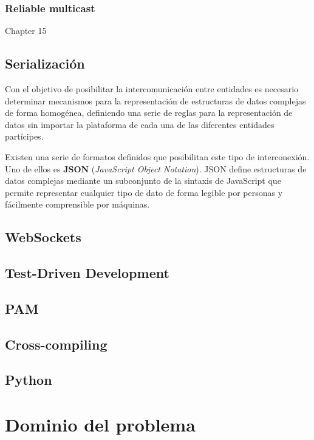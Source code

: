 \subsection{Reliable multicast}

Chapter 15

\section{Serialización}

Con el objetivo de posibilitar la intercomunicación entre entidades es necesario determinar mecanismos para la representación de estructuras de datos complejas de forma homogénea, definiendo una serie de reglas para la representación de datos sin importar la plataforma de cada una de las diferentes entidades partícipes.

Existen una serie de formatos definidos que posibilitan este tipo de interconexión. Uno de ellos es \textbf{JSON} (\textit{JavaScript Object Notation}). JSON define estructuras de datos complejas mediante un subconjunto de la sintaxis de JavaScript que permite representar cualquier tipo de dato de forma legible por personas y fácilmente comprensible por máquinas.

\section{WebSockets}

\section{Test-Driven Development}


\section{PAM}

\section{Cross-compiling}

\section{Python}

\chapter{Dominio del problema}

